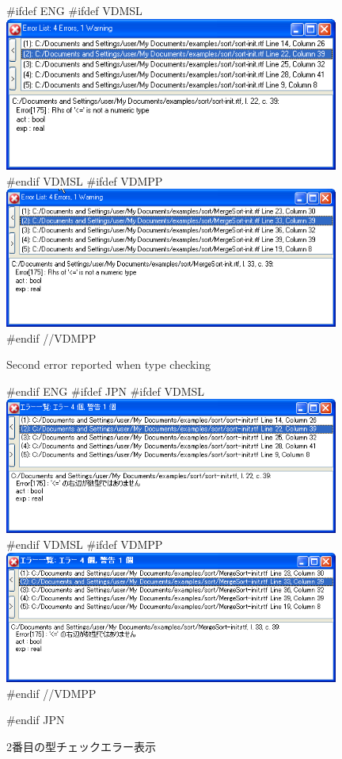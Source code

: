 \documentclass[\pformat,12pt]{article}
\begin{document}
\begin{figure}[tbh]
\begin{center}
#ifdef ENG
#ifdef VDMSL
\includegraphics[width=11cm]{typeError2-slENG.png}
#endif VDMSL
#ifdef VDMPP
\includegraphics[width=11cm]{typeError2-ppENG.png}
#endif //VDMPP
\caption{Second error reported when type checking}
#endif ENG
#ifdef JPN
#ifdef VDMSL
\includegraphics[width=11cm]{typeError2-sl.png}
#endif VDMSL
#ifdef VDMPP
\includegraphics[width=11cm]{typeError2-pp.png}
#endif //VDMPP
\caption{2番目の型チェックエラー表示}
#endif JPN
\label{fig:type_error2}
\end{center}
\end{figure}
\end{document}

